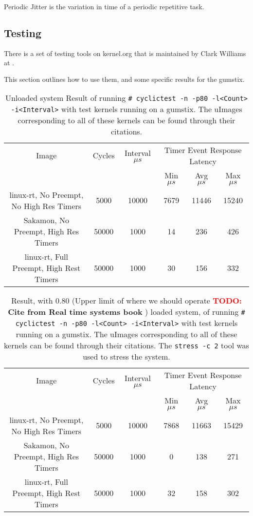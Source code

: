 \documentclass{article}
\newcommand{\TODO}[1]{ {\bf \textcolor{red}{TODO:} #1 }}
\begin{document}
Periodic Jitter is the variation in time of a periodic repetitive task.  

\subsection{Testing}
There is a set of testing tools on kernel.org that is maintained by Clark Williams at \cite{RTTest}.

This section outlines how to use them, and some specific results for the gumstix.

\begin{table}[h]
\centering
\begin{tabular}{|c|c|c|ccc|}
\hline
Image & Cycles & Interval $\mu s$ & \multicolumn{3}{|c|}{Timer Event Response Latency}\\
      &        &                  & Min $\mu s$  & Avg $\mu s$  & Max $ \mu s$\\
\hline
linux-rt, No Preempt, No High Res Timers\cite{worstCaseKern}&5000&10000&7679&11446&15240\\
Sakamon, No Preempt, High Res Timers\cite{sakamonKern}&50000&1000&14&236&426\\
linux-rt, Full Preempt, High Rest Timers\cite{rtKern}&50000&1000&30&156&332\\
\hline
\end{tabular}
\caption{Unloaded system Result of running \texttt{\# cyclictest -n -p80 -l<Count> -i<Interval>} with test kernels running on a gumstix.  The uImages corresponding to all of these kernels can be found through their citations.}
\label{tab:cyclictestResultsNoLoad}
\end{table}

\begin{table}[h]
\centering
\begin{tabular}{|c|c|c|ccc|}
\hline
Image & Cycles & Interval $\mu s$ & \multicolumn{3}{|c|}{Timer Event Response Latency}\\
      &        &                  & Min $\mu s$  & Avg $\mu s$  & Max $ \mu s$\\
\hline
linux-rt, No Preempt, No High Res Timers\cite{worstCaseKern}&5000&10000&7868&11663&15429\\
Sakamon, No Preempt, High Res Timers\cite{sakamonKern}&50000&1000&0&138&271\\
linux-rt, Full Preempt, High Rest Timers\cite{rtKern}&50000&1000&32&158&302\\
\hline
\end{tabular}
\caption{Result, with 0.80 (Upper limit of where we should operate \TODO{Cite from Real time systems book}) loaded system, of running \texttt{\# cyclictest -n -p80 -l<Count> -i<Interval>} with test kernels running on a gumstix.  The uImages corresponding to all of these kernels can be found through their citations. The \texttt{stress -c 2} tool was used to stress the system.}
\label{tab:cyclictestResuts}
\end{table}
\end{document}
